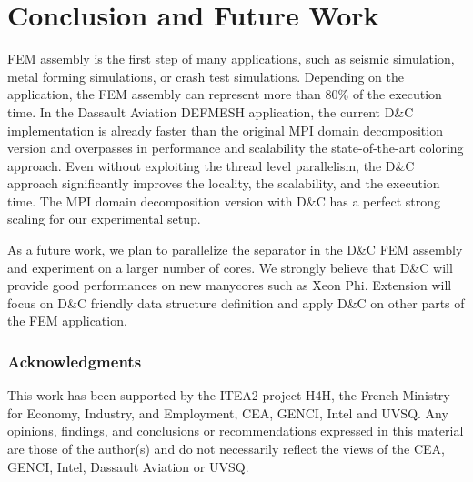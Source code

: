 \documentclass[10pt]{IOS-Book-Article}
\begin{document}

\section{Conclusion and Future Work}
\label{sec:conc}
FEM assembly is the first step of many applications, such as seismic simulation, metal forming simulations, or crash test simulations.
Depending on the application, the FEM assembly can represent more than 80\% of the execution time.
In the Dassault Aviation DEFMESH application, the current D\&C implementation is already faster than the original  MPI domain decomposition version and overpasses in performance and scalability the state-of-the-art coloring approach.
Even without exploiting the thread level parallelism, the D\&C approach significantly improves the locality, the scalability, and the execution time.
The MPI domain decomposition version with D\&C has a perfect strong scaling for our experimental setup.

As a future work, we plan to parallelize the separator in the D\&C FEM assembly and experiment on a larger number of cores.
We strongly believe that D\&C will provide good performances on new manycores such as Xeon Phi.
Extension will focus on D\&C friendly data structure definition and apply D\&C on other parts of the FEM application. 

\subsubsection*{Acknowledgments} \scriptsize{
This work has been supported by the ITEA2 project H4H, the French Ministry for Economy,
Industry, and Employment, CEA, GENCI, Intel and UVSQ.  Any opinions,
findings, and conclusions or recommendations expressed in this
material are those of the author(s) and do not necessarily reflect the
views of the CEA, GENCI, Intel, Dassault Aviation or UVSQ.}



\end{document}
